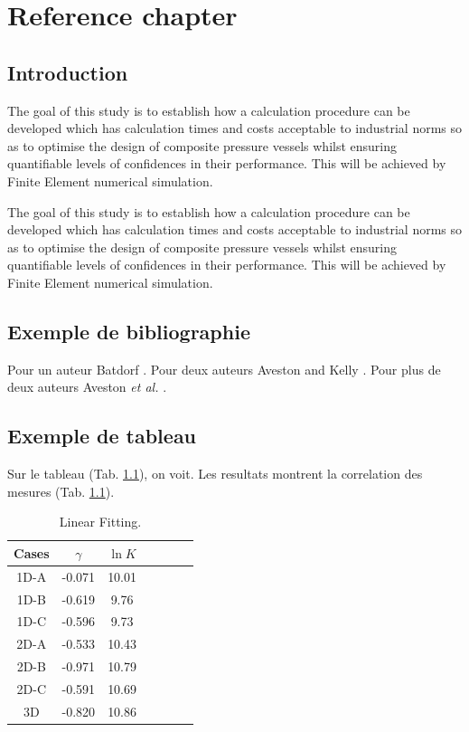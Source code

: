 \chapter{Reference chapter} \label{section_chapter_xxx}


\section{Introduction} \label{section_chapter_xxx_lelabel}

The goal of this study is to establish how a calculation procedure can be developed
which has calculation times and costs acceptable to industrial norms so as to optimise
the design of composite pressure vessels whilst ensuring quantifiable levels of confidences
in their performance. This will be achieved by Finite Element numerical simulation.

The goal of this study is to establish how a calculation procedure can be developed
which has calculation times and costs acceptable to industrial norms so as to optimise
the design of composite pressure vessels whilst ensuring quantifiable levels of confidences
in their performance. This will be achieved by Finite Element  numerical simulation.


\section{Exemple de bibliographie} \label{section_chapter_xxx_exemple_de_biblio}

Pour un auteur Batdorf \cite{Batdorf1982a}. Pour deux auteurs Aveston and Kelly \cite{Aveston1973a}.
Pour plus de deux auteurs Aveston {\it et al.} \cite{Aveston1971a}.

\section{Exemple de tableau} \label{section_chapter_xxx_exemple_de_tableau}

Sur le tableau (Tab. \ref{table_chapter_xxx_lelabel}), on voit.
Les resultats montrent la correlation des mesures (Tab. \ref{table_chapter_xxx_lelabel}).


\begin{table}[!ht]
 \begin{center}
    \begin{tabular}{|c|c|c|c|c|c|c|}
   \hline
Cases   & $\gamma$ & $\ln K$ \\
\hline
1D-A  & -0.071 & 10.01 \\
1D-B    & -0.619 & 9.76 \\
1D-C    & -0.596 & 9.73 \\
2D-A    & -0.533 & 10.43 \\
2D-B    & -0.971 & 10.79 \\
2D-C    & -0.591 & 10.69 \\
3D      & -0.820 & 10.86 \\
   \hline
\end{tabular}
    \caption{
    \label{table_chapter_xxx_lelabel}
    Linear Fitting.
    }
 \end{center}
\end{table}



